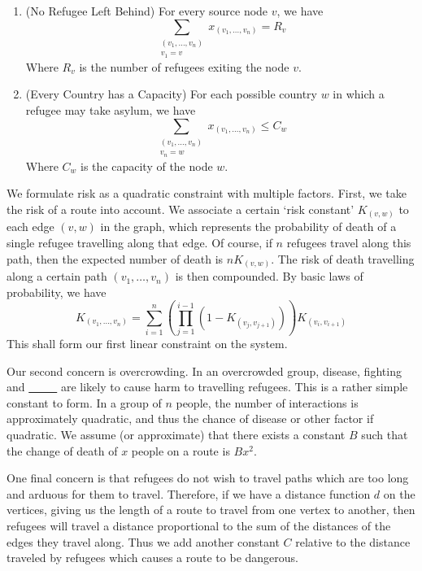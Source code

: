 \documentclass{article}
\begin{document}
\begin{enumerate}
    \item (No Refugee Left Behind) For every source node $v$, we have
    \[ \sum_{\substack{(v_1, \dots, v_n) \\ v_1 = v}} x_{(v_1, \dots, v_n)} = R_v \]
    Where $R_v$ is the number of refugees exiting the node $v$.

    \item (Every Country has a Capacity) For each possible country $w$ in which a refugee may take asylum, we have
    \[ \sum_{\substack{(v_1, \dots, v_n) \\ v_n = w}} x_{(v_1, \dots, v_n)} \leq C_w \]
    Where $C_w$ is the capacity of the node $w$.
\end{enumerate}

We formulate risk as a quadratic constraint with multiple factors. First, we take the risk of a route into account. We associate a certain `risk constant' $K_{(v,w)}$ to each edge $(v,w)$ in the graph, which represents the probability of death of a single refugee travelling along that edge. Of course, if $n$ refugees travel along this path, then the expected number of death is $n K_{(v,w)}$. The risk of death travelling along a certain path $(v_1, \dots, v_n)$ is then compounded. By basic laws of probability, we have
%
\[ K_{(v_1, \dots, v_n)} = \sum_{i = 1}^n \left( \prod_{j = 1}^{i-1} \left(1 - K_{(v_j,v_{j+1})} \right) \right) K_{(v_i, v_{i+1})} \]
%
This shall form our first linear constraint on the system.

Our second concern is overcrowding. In an overcrowded group, disease, fighting and \underline{\ \ \ \ \ } are likely to cause harm to travelling refugees. This is a rather simple constant to form. In a group of $n$ people, the number of interactions is approximately quadratic, and thus the chance of disease or other factor if quadratic. We assume (or approximate) that there exists a constant $B$ such that the change of death of $x$ people on a route is $Bx^2$.

One final concern is that refugees do not wish to travel paths which are too long and arduous for them to travel. Therefore, if we have a distance function $d$ on the vertices, giving us the length of a route to travel from one vertex to another, then refugees will travel a distance proportional to the sum of the distances of the edges they travel along. Thus we add another constant $C$ relative to the distance traveled by refugees which causes a route to be dangerous.
\end{document}
